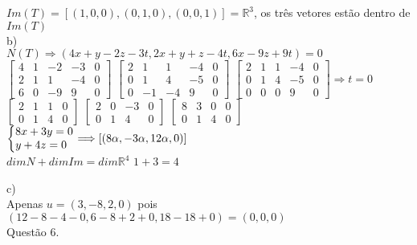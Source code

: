 \documentclass[12pt]{article}
\begin{document}
$Im(T)=[(1,0,0),(0,1,0),(0,0,1)]=\mathds{R}^{3}$, os três vetores estão dentro de $Im(T)$\\

\noindent b)\\

$N(T)\Longrightarrow(4x+y-2z-3t,2x+y+z-4t,6x-9z+9t)=0$\\

$\begin{bmatrix}
	4 & 1 & -2 & -3 & 0 \\
	2 & 1 & 1 & -4 & 0 \\
	6 & 0 & -9 & 9 & 0
\end{bmatrix}$\qquad
$\begin{bmatrix}
	2 & 1 & 1 & -4 & 0 \\
	0 & 1 & 4 & -5 & 0 \\
	0 & -1 & -4 & 9 & 0
\end{bmatrix}$\qquad
$\begin{bmatrix}
	2 & 1 & 1 & -4 & 0 \\
	0 & 1 & 4 & -5 & 0 \\
	0 & 0 & 0 & 9 & 0
\end{bmatrix}\Longrightarrow t=0$\\

$\begin{bmatrix}
	2 & 1 & 1 & 0 \\
	0 & 1 & 4 & 0
\end{bmatrix}$\qquad
$\begin{bmatrix}
	2 & 0 & -3 & 0 \\
	0 & 1 & 4 & 0
\end{bmatrix}$\qquad
$\begin{bmatrix}
	8 & 3 & 0 & 0 \\
	0 & 1 & 4 & 0
\end{bmatrix}$\qquad
$\left\{\begin{array}{@{}l@{}}
	8x+3y=0\\
	y+4z=0
\end{array}\right.\Longrightarrow [(8\alpha,-3\alpha,12\alpha,0)]$\\

$dimN+dimIm=dim\mathds{R}^{4}$\qquad\qquad
$1+3=4$\quad\checkmark

\noindent c)\\

Apenas $u=(3,-8,2,0)$ pois $(12-8-4-0,6-8+2+0,18-18+0)=(0,0,0)$\\
	
\noindent Questão 6.\\
\end{document}
